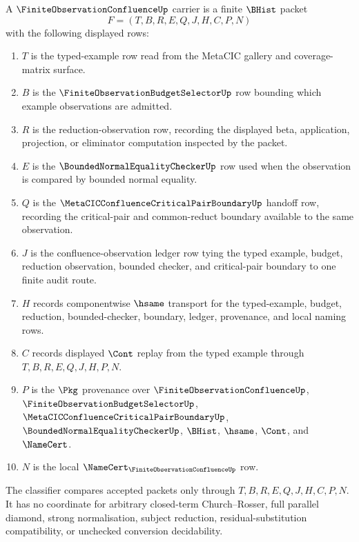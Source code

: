 \begin{definition}
\label{def:finite-observation-confluence-carrier}
A $\FiniteObservationConfluenceUp$ carrier is a finite $\BHist$ packet
$$
F=(T,B,R,E,Q,J,H,C,P,N)
$$
with the following displayed rows:
\begin{enumerate}
\item $T$ is the typed-example row read from the MetaCIC gallery and coverage-matrix surface.
\item $B$ is the $\FiniteObservationBudgetSelectorUp$ row bounding which example observations are admitted.
\item $R$ is the reduction-observation row, recording the displayed beta, application, projection, or eliminator computation inspected by the packet.
\item $E$ is the $\BoundedNormalEqualityCheckerUp$ row used when the observation is compared by bounded normal equality.
\item $Q$ is the $\MetaCICConfluenceCriticalPairBoundaryUp$ handoff row, recording the critical-pair and common-reduct boundary available to the same observation.
\item $J$ is the confluence-observation ledger row tying the typed example, budget, reduction observation, bounded checker, and critical-pair boundary to one finite audit route.
\item $H$ records componentwise $\hsame$ transport for the typed-example, budget, reduction, bounded-checker, boundary, ledger, provenance, and local naming rows.
\item $C$ records displayed $\Cont$ replay from the typed example through $T,B,R,E,Q,J,H,P,N$.
\item $P$ is the $\Pkg$ provenance over $\FiniteObservationConfluenceUp$, $\FiniteObservationBudgetSelectorUp$, $\MetaCICConfluenceCriticalPairBoundaryUp$, $\BoundedNormalEqualityCheckerUp$, $\BHist$, $\hsame$, $\Cont$, and $\NameCert$.
\item $N$ is the local $\NameCert_{\FiniteObservationConfluenceUp}$ row.
\end{enumerate}
The classifier compares accepted packets only through $T,B,R,E,Q,J,H,C,P,N$. It has no coordinate for arbitrary closed-term Church--Rosser, full parallel diamond, strong normalisation, subject reduction, residual-substitution compatibility, or unchecked conversion decidability.
\end{definition}


